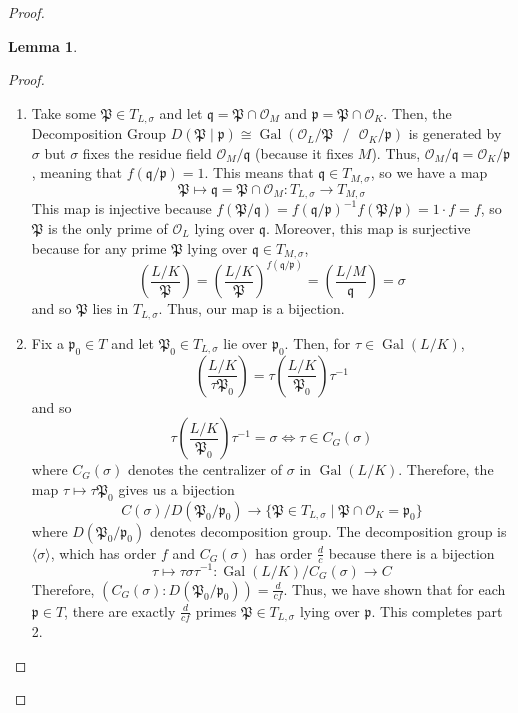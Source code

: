 \documentclass{article}
\DeclareMathOperator{\Gal}{Gal}
\theoremstyle{plain}
\newtheorem{lemma}[thm]{Lemma}
\theoremstyle{definition}
\theoremstyle{remark}
\numberwithin{equation}{section}
\numberwithin{thm}{section}
\begin{document}
\begin{proof}
\begin{lemma}
\end{lemma}

\begin{proof}

$ $ \\ \vspace{-0.4cm}



\begin{enumerate}
    \item Take some $\mathfrak{P} \in T_{L, \sigma}$ and let $\mathfrak{q} = \mathfrak{P} \cap \mathcal{O}_M$ and $\mathfrak{p} = \mathfrak{P} \cap \mathcal{O}_K$. Then, the Decomposition Group $D(\mathfrak{P}\mid\mathfrak{p}) \cong \Gal(\mathcal{O}_L/\mathfrak{P} \text{ } / \text{ } \mathcal{O}_K/\mathfrak{p})$ is generated by $\sigma$ but $\sigma$ fixes the residue field $\mathcal{O}_M/\mathfrak{q}$ (because it fixes $M$). Thus, $\mathcal{O}_M/\mathfrak{q} = \mathcal{O}_K/\mathfrak{p}$, meaning that $f(\mathfrak{q}/\mathfrak{p}) = 1$. This means that $\mathfrak{q} \in T_{M, \sigma}$, so we have a map $$\mathfrak{P} \mapsto \mathfrak{q} = \mathfrak{P} \cap \mathcal{O}_M : T_{L, \sigma} \to T_{M, \sigma}$$ This map is injective because $f(\mathfrak{P}/\mathfrak{q}) = f(\mathfrak{q}/\mathfrak{p})^{-1}f(\mathfrak{P}/\mathfrak{p}) = 1 \cdot f = f$, so $\mathfrak{P}$ is the only prime of $\mathcal{O}_L$ lying over $\mathfrak{q}$. Moreover, this map is surjective because for any prime $\mathfrak{P}$ lying over $\mathfrak{q} \in T_{M, \sigma}$, $$\left(\frac{L/K}{\mathfrak{P}}\right) = \left(\frac{L/K}{\mathfrak{P}}\right)^{f(\mathfrak{q}/\mathfrak{p})} = \left(\frac{L/M}{\mathfrak{q}}\right) = \sigma$$ and so $\mathfrak{P}$ lies in $T_{L, \sigma}$. Thus, our map is a bijection.

    \item Fix a $\mathfrak{p}_{0} \in T$ and let $\mathfrak{P}_{0} \in T_{L, \sigma}$ lie over $\mathfrak{p}_{0}$. Then, for $\tau \in \Gal(L/K)$, $$\left(\frac{L/K}{\tau\mathfrak{P}_{0}}\right) = \tau\left(\frac{L/K}{\mathfrak{P}_{0}}\right)\tau^{-1}$$ and so $$\tau\left(\frac{L/K}{\mathfrak{P}_{0}}\right)\tau^{-1} = \sigma \Longleftrightarrow \tau \in C_{G}(\sigma)$$ where $C_{G}(\sigma)$ denotes the centralizer of $\sigma$ in $\Gal(L/K)$. Therefore, the map $\tau \mapsto \tau\mathfrak{P}_{0}$ gives us a bijection $$C(\sigma)/D(\mathfrak{P}_{0}/\mathfrak{p}_{0}) \longrightarrow \{\mathfrak{P} \in T_{L, \sigma} \mid \mathfrak{P} \cap \mathcal{O}_K = \mathfrak{p}_{0}\}$$ where $D(\mathfrak{P}_{0}/\mathfrak{p}_{0})$ denotes decomposition group. The decomposition group is $\langle\sigma\rangle$, which has order $f$ and $C_{G}(\sigma)$ has order $\frac{d}{c}$ because there is a bijection $$\tau \mapsto \tau\sigma\tau^{-1} : \Gal(L/K) / C_{G}(\sigma) \to C$$ Therefore, $(C_{G}(\sigma) : D(\mathfrak{P}_{0}/\mathfrak{p}_{0})) = \frac{d}{cf}$. Thus, we have shown that for each $\mathfrak{p} \in T$, there are exactly $\frac{d}{cf}$ primes $\mathfrak{P} \in T_{L, \sigma}$ lying over $\mathfrak{p}$. This completes part 2.  


\end{enumerate}
\end{proof}
\end{proof}
\end{document}
